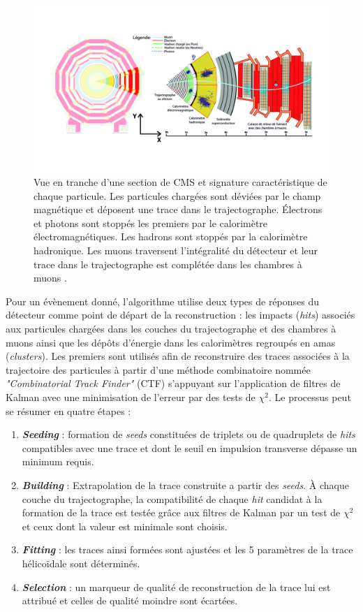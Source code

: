 \begin{figure}
\centering
    \includegraphics[scale=1.1]{Chapitre4/Images/CMSslice.png} 
    \caption{Vue en tranche d'une section de CMS et signature caractéristique de chaque particule. Les particules chargées sont déviées par le champ magnétique et déposent une trace dans le trajectographe. Électrons et photons sont stoppés les premiers par le calorimètre électromagnétiques. Les hadrons sont stoppés par la calorimètre hadronique. Les muons traversent l'intégralité du détecteur et leur trace dans le trajectographe est complétée dans les chambres à muons \cite{Barney:2120661}.}
    \label{CMSslice}
\end{figure} 

Pour un évènement donné, l'algorithme utilise deux types de réponses du détecteur comme point de départ de la reconstruction : les impacts (\textit{hits}) associés aux particules chargées dans les couches du trajectographe et des chambres à muons ainsi que les dépôts d'énergie dans les calorimètres regroupés en amas (\textit{clusters}). Les premiers sont utilisés afin de reconstruire des traces associées à la trajectoire des particules à partir d'une méthode combinatoire nommée \textit{"Combinatorial Track Finder"} (CTF) \cite{Elmetenawee:2020emw} s'appuyant sur l'application de filtres de Kalman avec une minimisation de l'erreur par des tests de $\chi^2$. Le processus peut se résumer en quatre étapes :

\begin{enumerate}
    \item \textbf{\textit{Seeding}} : formation de \textit{seeds} constituées de triplets ou de quadruplets de \textit{hits} compatibles avec une trace et dont le seuil en impulsion transverse dépasse un minimum requis.
    \item \textbf{\textit{Building}} : Extrapolation de la trace construite a partir des \textit{seeds}. À chaque couche du trajectographe, la compatibilité de chaque \textit{hit} candidat à la formation de la trace est testée grâce aux filtres de Kalman par un test de $\chi^2$ et ceux dont la valeur est minimale sont choisis.
    \item \textbf{\textit{Fitting}} : les traces ainsi formées sont ajustées et les 5 paramètres de la trace hélicoïdale sont déterminés. 
    \item \textbf{\textit{Selection}} : un marqueur de qualité de reconstruction de la trace lui est attribué et celles de qualité moindre sont écartées. 
\end{enumerate}

